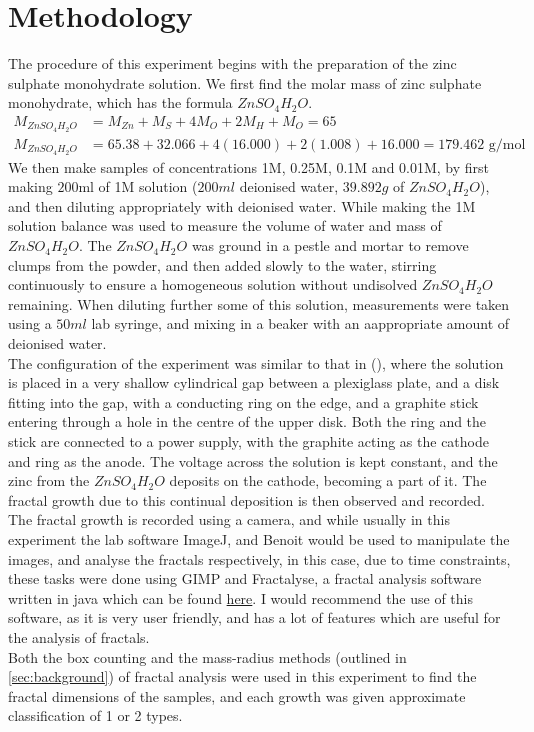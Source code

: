 \documentclass{article}
\theoremstyle{definition}
\theoremstyle{remark}
\begin{document}
\section{Methodology}\label{sec:methodology}
The procedure of this experiment begins with the preparation of the zinc sulphate monohydrate solution. We first find the molar mass of zinc sulphate monohydrate, which has the formula $ZnSO_4H_2O$.
\begin{align*}
        M_{ZnSO_4H_2O} &= M_{Zn} + M_{S} + 4M_{O} + 2M_{H} + M_{O} = 65\\
        M_{ZnSO_4H_2O} &= 65.38 + 32.066 + 4(16.000) + 2(1.008) + 16.000 = 179.462\text{ g/mol}
\end{align*}
We then make samples of concentrations 1M, 0.25M, 0.1M and 0.01M, by first making $200$ml of 1M solution ($200ml$ deionised water, $39.892g$ of $ZnSO_4H_2O$), and then diluting appropriately with deionised water.
\indent While making the 1M solution balance was used to measure the volume of water and mass of $ZnSO_4H_2O$. The $ZnSO_4H_2O$ was ground in a pestle and mortar to remove clumps from the powder, and then added slowly to the water, stirring continuously to ensure a homogeneous solution without undisolved $ZnSO_4H_2O$ remaining. When diluting further some of this solution, measurements were taken using a $50ml$ lab syringe, and mixing in a beaker with an aappropriate amount of deionised water.\\
\indent The configuration of the experiment was similar to that in (\cite{PhysRevLett.56.1260}), where the solution is placed in a very shallow cylindrical gap between a plexiglass plate, and a disk fitting into the gap, with a conducting ring on the edge, and a graphite stick entering through a hole in the centre of the upper disk. Both the ring and the stick are connected to a power supply, with the graphite acting as the cathode and ring as the anode. The voltage across the solution is kept constant, and the zinc from the $ZnSO_4H_2O$ deposits on the cathode, becoming a part of it. The fractal growth due to this continual deposition is then observed and recorded.\\
\indent The fractal growth is recorded using a camera, and while usually in this experiment the lab software ImageJ, and Benoit would be used to manipulate the images, and analyse the fractals respectively, in this case, due to time constraints, these tasks were done using GIMP and Fractalyse, a fractal analysis software written in java which can be found \href{https://sourcesup.renater.fr/www/fractalyse/}{here}. I would recommend the use of this software, as it is very user friendly, and has a lot of features which are useful for the analysis of fractals.\\
\indent Both the box counting and the mass-radius methods (outlined in \ref{sec:background}) of fractal analysis were used in this experiment to find the fractal dimensions of the samples, and each growth was given approximate classification of 1 or 2 types.
\end{document}
